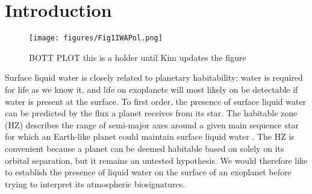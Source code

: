 \documentclass[
    usenatbib,
]{mnras}
\begin{document}
\section{Introduction}
\label{sec:intro}

\begin{figure*}%
   \centering
   \texttt{[image: figures/Fig1IWAPol.png]}
   \caption{BOTT PLOT this is a holder until Kim updates the figure}
    \label{fig:bottplot}
\end{figure*}



Surface liquid water is closely related to planetary habitability: water is required for life as we know it, and life on exoplanets will most likely on be detectable if water is present at the surface. 
To first order, the presence of surface liquid water can be predicted by the flux a planet receives from its star. The habitable zone (HZ) describes the range of semi-major axes around a given main sequence star for which an Earth-like planet could maintain surface liquid water \citep{kasting93}.  The HZ is convenient because a planet can be deemed habitable based on solely on its orbital separation, but it remains an untested hypothesis. We would therefore like to establish the presence of liquid water on the surface of an exoplanet before trying to interpret its atmospheric biosignatures. %


\end{document}
